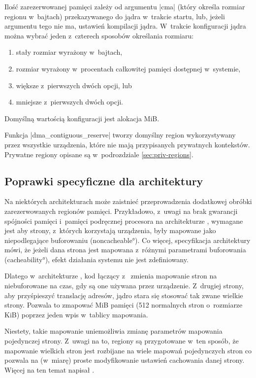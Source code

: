Ilość zarezerwowanej pamięci zależy od argumentu \code|cma| (który
określa rozmiar regionu w~bajtach) przekazywanego do jądra w~trakcie
startu, lub, jeżeli argumentu tego nie ma, ustawień kompilacji jądra.
W~trakcie konfiguracji jądra można wybrać jeden z~czterech sposobów
określania rozmiaru:

\begin{enumerate}
\item stały rozmiar wyrażony w~bajtach,
\item rozmiar wyrażony w~procentach całkowitej pamięci dostępnej
  w~systemie,
\item większe z~pierwszych dwóch opcji, lub
\item mniejsze z~pierwszych dwóch opcji.
\end{enumerate}

Domyślną wartością konfiguracji jest alokacja \unit[16]{MiB}.

Funkcja \code|dma_contiguous_reserve| tworzy domyślny region 
wykorzystywany przez wszystkie urządzenia, które nie mają przypisanych
prywatnych kontekstów.  Prywatne regiony opisane są w~podrozdziale
\ref{sec:priv-regions}.


\subsection{Poprawki specyficzne dla architektury}

Na niektórych architekturach może zaistnieć przeprowadzenia dodatkowej
obróbki zarezerwowanych regionów pamięci.  Przykładowo, z~uwagi na
brak gwarancji spójności pamięci  i~pamięci podręcznej procesora na
architekturze  \autocite[podrozdział B5.5]{bib:arm-arch-reference},
wymagane jest aby strony, z~których korzystają urządzenia, były
mapowane jako niepodlegające buforowaniu (\ang{noncacheable}).  Co
więcej, specyfikacja architektury mówi, że jeżeli dana strona jest
mapowana z~różnymi parametrami buforowania (\ang{cacheability}), efekt
działania systemu nie jest zdefiniowany.

Dlatego w~architekturze , kod łączący  z~
 zmienia mapowanie stron na niebuforowane na czas, gdy są one
używana przez urządzenie.  Z~drugiej strony, aby przyśpieszyć
translację adresów, jądro stara się stosować tak zwane wielkie strony.
Pozwala to zmapować \unit[2]{MiB} pamięci (512 normalnych stron
o~rozmiarze \unit[4]{KiB}) poprzez jeden wpis w~tablicy mapowania.

Niestety, takie mapowanie uniemożliwia zmianę parametrów mapowania
pojedynczej strony.  Z~uwagi na to, regiony  są przygotowane w~ten
sposób, że mapowanie wielkich stron jest rozbijane na wiele mapowań
pojedynczych stron co pozwala na (w~miarę) proste modyfikowanie
ustawień cachowania danej strony.  Więcej na ten temat napisał
\textcite{bib:cma-and-arm}.

